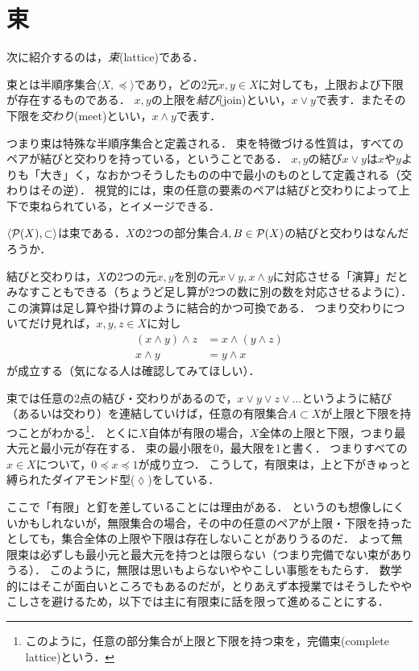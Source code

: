 \documentclass[11pt,a4paper]{jsarticle}
\begin{document}
\section{束}

次に紹介するのは，\emph{束}(lattice)である．

\begin{dfn}[束]
束とは半順序集合$\langle X, \preceq \rangle$であり，どの2元$x, y \in X$に対しても，上限および下限が存在するものである．
$x, y$の上限を\emph{結び}(join)といい，$x \vee y$で表す．またその下限を\emph{交わり}(meet)といい，$x \wedge y$で表す．
\end{dfn}

つまり束は特殊な半順序集合と定義される．
束を特徴づける性質は，すべてのペアが結びと交わりを持っている，ということである．
$x,y$の結び$x \vee y$は$x$や$y$よりも「大き」く，なおかつそうしたものの中で最小のものとして定義される（交わりはその逆）．
視覚的には，束の任意の要素のペアは結びと交わりによって上下で束ねられている，とイメージできる．

\begin{exercise}
 $\langle \mathcal{P}(X), \subset \rangle$は束である．$X$の2つの部分集合$A, B \in \mathcal{P}(X)$の結びと交わりはなんだろうか．
\end{exercise}

結びと交わりは，$X$の2つの元$x,y$を別の元$x \vee y, x \wedge y$に対応させる「演算」だとみなすこともできる（ちょうど足し算が2つの数に別の数を対応させるように）．
この演算は足し算や掛け算のように結合的かつ可換である．
つまり交わりについてだけ見れば，$x, y, z \in X$に対し
\begin{align}
(x \wedge y) \wedge z &= x \wedge (y \wedge z) \\
x \wedge y &= y \wedge x
\end{align}
が成立する（気になる人は確認してみてほしい）．


束では任意の2点の結び・交わりがあるので，$x \vee y \vee z \vee \dots$というように結び（あるいは交わり）を連結していけば，任意の有限集合$A \subset X$が上限と下限を持つことがわかる\footnote{このように，任意の部分集合が上限と下限を持つ束を，完備束(complete lattice)という．}．
とくに$X$自体が有限の場合，$X$全体の上限と下限，つまり最大元と最小元が存在する．
束の最小限を0，最大限を1と書く．
つまりすべての$x \in X$について，$0 \preceq x \preceq 1$が成り立つ．
こうして，有限束は，上と下がきゅっと縛られたダイアモンド型($\lozenge$)をしている．

ここで「有限」と釘を差していることには理由がある．
というのも想像しにくいかもしれないが，無限集合の場合，その中の任意のペアが上限・下限を持ったとしても，集合全体の上限や下限は存在しないことがありうるのだ．
よって無限束は必ずしも最小元と最大元を持つとは限らない（つまり完備でない束がありうる）．
このように，無限は思いもよらないややこしい事態をもたらす．
数学的にはそこが面白いところでもあるのだが，とりあえず本授業ではそうしたややこしさを避けるため，以下では主に有限束に話を限って進めることにする．
\end{document}
